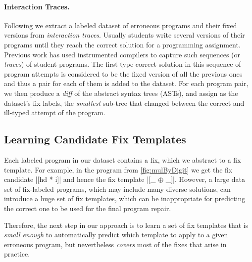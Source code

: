 \paragraph{Interaction Traces.}
Following \citep{Seidel:2017} we extract a labeled dataset of erroneous programs
and their fixed versions from \emph{interaction traces}. Usually students write
several versions of their programs until they reach the correct solution for a
programming assignment. Previous work has used instrumented compilers to capture
such sequences (or \emph{traces}) of student programs. 
The first type-correct
solution in this sequence of program attempts is considered to be the fixed
version of all the previous ones and thus a pair for each of them is added to
the dataset.
For each program pair, we then produce a \emph{diff} of the abstract syntax
trees (ASTs), and assign as the dataset's fix labels, the \emph{smallest}
sub-tree that changed between the correct and ill-typed attempt of the program.


\subsection{Learning Candidate Fix Templates}
\label{sec:overview:learn}

Each labeled program in our dataset contains a fix, which we abstract to a fix
template. For example, in the \mbd program from \autoref{fig:mulByDigit} we get
the fix candidate |[hd * i]| and hence the fix template |[_ $\oplus$ _]|.
However, a large data set of fix-labeled programs, which may include many
diverse solutions, can introduce a huge set of fix templates, which can be
inappropriate for predicting the correct one to be used for the final program
repair.

Therefore, the next step in our approach is to learn a set of fix templates
that is \emph{small enough} to automatically predict which template to apply to
a given erroneous program, but nevertheless \emph{covers} most of the fixes that
arise in practice.

